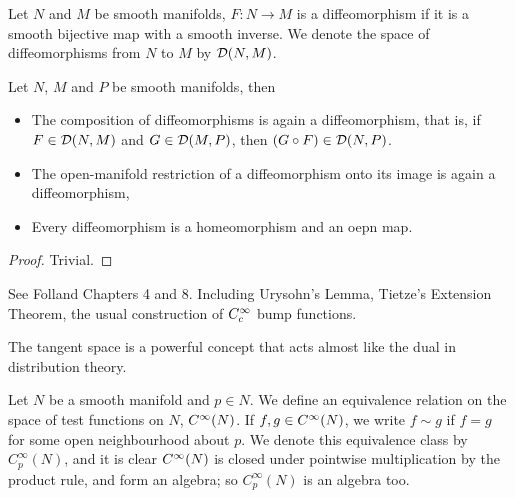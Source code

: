 \documentclass[../main-manifolds.tex]{subfiles}
\begin{document}
\begin{definition}\label{lee-chp2:diffeomorphism-definition}
    Let $N$ and $M$ be smooth manifolds, $F:N\to M$ is a diffeomorphism if it is a smooth bijective map with a smooth inverse. We denote the space of diffeomorphisms from $N$ to $M$ by $\diffeo[N,M]$.
\end{definition}
\begin{wts}\label{lee-chp2-diffeomorphism-properties}
    Let $N$, $M$ and $P$ be smooth manifolds, then
    \begin{itemize}
        \item The composition of diffeomorphisms is again a diffeomorphism, that is, if $F\in \diffeo[N,M]$ and $G\in \diffeo[M,P]$, then $(G\circ F)\in \diffeo[N,P]$.
        \item The open-manifold restriction of a diffeomorphism onto its image is again a diffeomorphism,
        \item Every diffeomorphism is a homeomorphism and an oepn map.
    \end{itemize}
\end{wts}
\begin{proof}
    Trivial.
\end{proof}

See Folland Chapters 4 and 8. Including Urysohn's Lemma, Tietze's Extension Theorem, the usual construction of $C_c^\infty$ bump functions.
\newpage

\newpage
{}
The tangent space is a powerful concept that acts almost like the dual in distribution theory.
\begin{definition}\label{lee-chp3:algebra-of-germs-at-p}
    Let $N$ be a smooth manifold and $p\in N$. We define an equivalence relation on the space of test functions on $N$, $\cinf[N]$. If $f,g\in\cinf[N]$, we write $f\sim g$ if $f=g$ for some open neighbourhood about $p$. We denote this equivalence class by $C_p^\infty(N)$, and it is clear $\cinf[N]$ is closed under pointwise multiplication by the product rule, and form an algebra; so $C_p^\infty(N)$ is an algebra too.
\end{definition}
\end{document}
